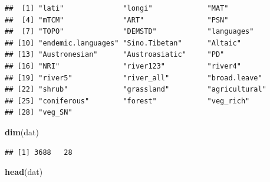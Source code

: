 \documentclass[12pt,]{article}
\newenvironment{Shaded}{\begin{snugshade}}{\end{snugshade}}
\newcommand{\KeywordTok}[1]{\textcolor[rgb]{0.13,0.29,0.53}{\textbf{#1}}}
\newcommand{\NormalTok}[1]{#1}
\begin{document}
\begin{verbatim}
##  [1] "lati"              "longi"             "MAT"              
##  [4] "mTCM"              "ART"               "PSN"              
##  [7] "TOPO"              "DEMSTD"            "languages"        
## [10] "endemic.languages" "Sino.Tibetan"      "Altaic"           
## [13] "Austronesian"      "Austroasiatic"     "PD"               
## [16] "NRI"               "river123"          "river4"           
## [19] "river5"            "river_all"         "broad.leave"      
## [22] "shrub"             "grassland"         "agricultural"     
## [25] "coniferous"        "forest"            "veg_rich"         
## [28] "veg_SN"
\end{verbatim}

\begin{Shaded}
\begin{Highlighting}[]
\KeywordTok{dim}\NormalTok{(dat)}
\end{Highlighting}
\end{Shaded}

\begin{verbatim}
## [1] 3688   28
\end{verbatim}

\begin{Shaded}
\begin{Highlighting}[]
\KeywordTok{head}\NormalTok{(dat)}
\end{Highlighting}
\end{Shaded}
\end{document}
